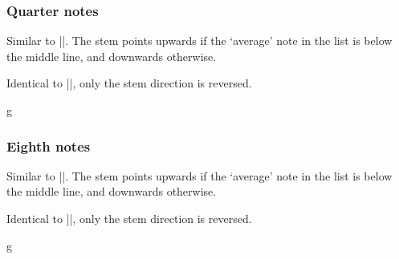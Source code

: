 \subsubsection{Quarter notes}\label{sec:music-notes:commands:quarter}
\begin{command}{\tmquarter{}}
  Similar to |\tmwhole|. The stem points upwards if the `average' note 
  in the list is below the middle line, and downwards otherwise.
\end{command}
\begin{command}{\tmquarter*{}}
  Identical to |\tmquarter|, only the stem direction is reversed.
\end{command}
\begin{codeexample}[]
\begin{tmline}%
\begin{tmstaff}{g}{}
     
\end{tmstaff}%
\end{tmline}
\end{codeexample}
\subsubsection{Eighth notes}\label{sec:music-notes:commands:eighth}
\begin{command}{\tmeighth{}}
  Similar to |\tmwhole|. The stem points upwards if the `average' note 
  in the list is below the middle line, and downwards otherwise.
\end{command}
\begin{command}{\tmeighth*{}}
  Identical to |\tmeighth|, only the stem direction is reversed.
\end{command}
\begin{codeexample}[]
\begin{tmline}%
\begin{tmstaff}{g}{}
     
\end{tmstaff}%
\end{tmline}
\end{codeexample}
